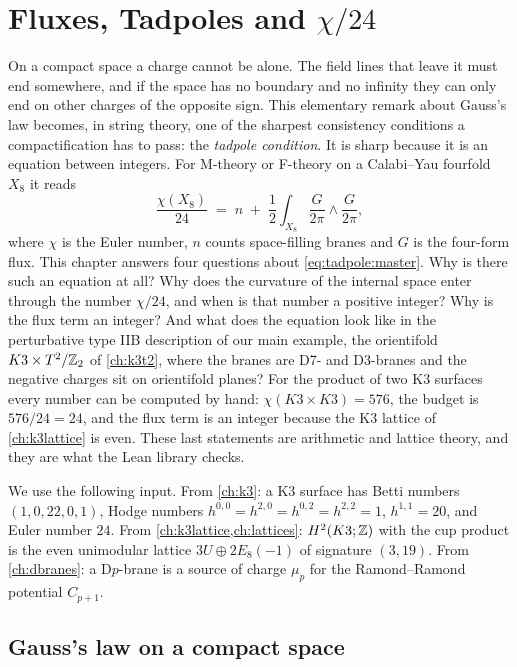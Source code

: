 \chapter{Fluxes, Tadpoles and \texorpdfstring{$\chi/24$}{chi/24}}\label{ch:tadpole}

On a compact space a charge cannot be alone. The field lines that leave it must end
somewhere, and if the space has no boundary and no infinity they can only end on other
charges of the opposite sign. This elementary remark about Gauss's law becomes, in string
theory, one of the sharpest consistency conditions a compactification has to pass: the
\emph{tadpole condition}. It is sharp because it is an equation between integers. For
M-theory or F-theory on a Calabi--Yau fourfold $X_8$ it reads
\begin{equation}\label{eq:tadpole:master}
 \frac{\chi(X_8)}{24}\;=\;n\;+\;\frac12\int_{X_8}\frac{G}{2\pi}\wedge\frac{G}{2\pi},
\end{equation}
where $\chi$ is the Euler number, $n$ counts space-filling branes and $G$ is the four-form
flux. This chapter answers four questions about \eqref{eq:tadpole:master}. Why is there such
an equation at all? Why does the curvature of the internal space enter through the number
$\chi/24$, and when is that number a positive integer? Why is the flux term an integer? And
what does the equation look like in the perturbative type IIB description of our main example,
the orientifold $K3\times T^2/\mathbb{Z}_2$ of \cref{ch:k3t2}, where the branes are D7- and D3-branes and the
negative charges sit on orientifold planes? For the product of two K3 surfaces every number
can be computed by hand: $\chi(K3\times K3)=576$, the budget is $576/24=24$, and the flux term
is an integer because the K3 lattice of \cref{ch:k3lattice} is even. These last statements
are arithmetic and lattice theory, and they are what the Lean library checks.

We use the following input. From \cref{ch:k3}: a K3 surface has Betti numbers $(1,0,22,0,1)$,
Hodge numbers $h^{0,0}=h^{2,0}=h^{0,2}=h^{2,2}=1$, $h^{1,1}=20$, and Euler number $24$. From
\cref{ch:k3lattice,ch:lattices}: $H^2(K3;\mathbb{Z})$ with the cup product is the even unimodular
lattice $3U\oplus2E_8(-1)$ of signature $(3,19)$. From \cref{ch:dbranes}: a D$p$-brane is a
source of charge $\mu_p$ for the Ramond--Ramond potential $C_{p+1}$.

\section{Gauss's law on a compact space}\label{sec:tadpole:gauss}

